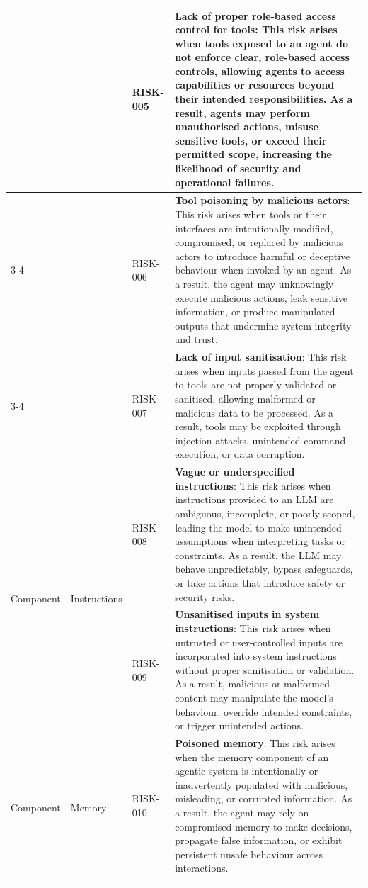 \documentclass{article}
\begin{document}
\begin{longtable}{|p{}|p{}|p{}|p{}|}
& & RISK-005 & \textbf{Lack of proper role-based access control for tools}: This risk arises when tools exposed to an agent do not enforce clear, role-based access controls, allowing agents to access capabilities or resources beyond their intended responsibilities. As a result, agents may perform unauthorised actions, misuse sensitive tools, or exceed their permitted scope, increasing the likelihood of security and operational failures. \\ \cline{3-4}
& & RISK-006 & \textbf{Tool poisoning by malicious actors}: This risk arises when tools or their interfaces are intentionally modified, compromised, or replaced by malicious actors to introduce harmful or deceptive behaviour when invoked by an agent. As a result, the agent may unknowingly execute malicious actions, leak sensitive information, or produce manipulated outputs that undermine system integrity and trust. \\ \cline{3-4}
& & RISK-007 & \textbf{Lack of input sanitisation}: This risk arises when inputs passed from the agent to tools are not properly validated or sanitised, allowing malformed or malicious data to be processed. As a result, tools may be exploited through injection attacks, unintended command execution, or data corruption. \\ \hline
\multirow{2}{=}{Component}
& \multirow{2}{=}{Instructions}
& RISK-008 & \textbf{Vague or underspecified instructions}: This risk arises when instructions provided to an LLM are ambiguous, incomplete, or poorly scoped, leading the model to make unintended assumptions when interpreting tasks or constraints. As a result, the LLM may behave unpredictably, bypass safeguards, or take actions that introduce safety or security risks. \\ \cline{3-4}
& & RISK-009 & \textbf{Unsanitised inputs in system instructions}: This risk arises when untrusted or user-controlled inputs are incorporated into system instructions without proper sanitisation or validation. As a result, malicious or malformed content may manipulate the model's behaviour, override intended constraints, or trigger unintended actions. \\ \hline
\multirow{2}{=}{Component}
& \multirow{2}{=}{Memory}
& RISK-010 & \textbf{Poisoned memory}: This risk arises when the memory component of an agentic system is intentionally or inadvertently populated with malicious, misleading, or corrupted information. As a result, the agent may rely on compromised memory to make decisions, propagate false information, or exhibit persistent unsafe behaviour across interactions. \\ \cline{3-4}

\end{longtable}
\end{document}
